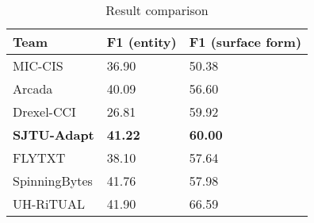 \begin{table}[th]
	\small
	\centering
	\caption{Result comparison}
	\label{tbl:compare}
	\begin{tabular}{|l|l|l|}
		\hline
		Team                & F1 (entity)    & F1 (surface form) \\ \hline
		MIC-CIS             & 36.90          & 50.38             \\ \hline
		Arcada              & 40.09          & 56.60             \\ \hline
		Drexel-CCI          & 26.81          & 59.92             \\ \hline
		\textbf{SJTU-Adapt} & \textbf{41.22} & \textbf{60.00}    \\ \hline
		FLYTXT              & 38.10          & 57.64             \\ \hline
		SpinningBytes       & 41.76          & 57.98             \\ \hline
		UH-RiTUAL           & 41.90          & 66.59             \\ \hline
	\end{tabular}
\end{table}

